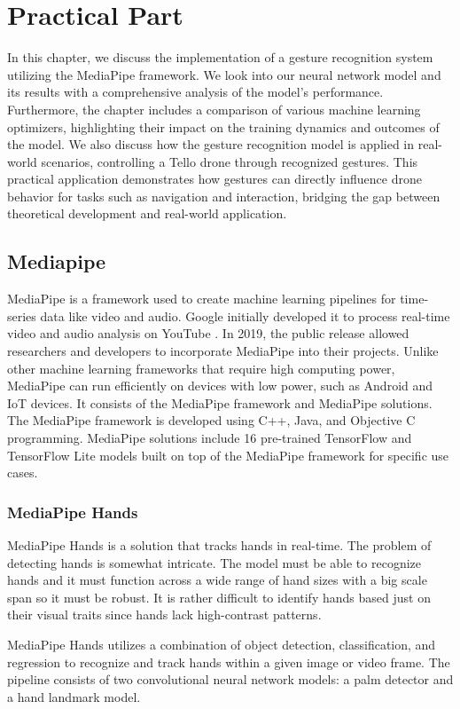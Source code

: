 \chapter{Practical Part}
In this chapter, we discuss the implementation of a gesture recognition system utilizing the MediaPipe framework. We look into our neural network model and its results with a comprehensive analysis of the model's performance. Furthermore, the chapter includes a comparison of various machine learning optimizers, highlighting their impact on the training dynamics and outcomes of the model. We also discuss how the gesture recognition model is applied in real-world scenarios, controlling a Tello drone through recognized gestures. This practical application demonstrates how gestures can directly influence drone behavior for tasks such as navigation and interaction, bridging the gap between theoretical development and real-world application.
\section{Mediapipe}
MediaPipe is a framework used to create machine learning pipelines for time-series data like video and audio. Google initially developed it to process real-time video and audio analysis on YouTube \cite{mediapipe2019blog}. In 2019, the public release allowed researchers and developers to incorporate MediaPipe into their projects. Unlike other machine learning frameworks that require high computing power, MediaPipe can run efficiently on devices with low power, such as Android and IoT devices. It consists of the MediaPipe framework and MediaPipe solutions. The MediaPipe framework is developed using C++, Java, and Objective C programming. MediaPipe solutions include 16 pre-trained TensorFlow and TensorFlow Lite models built on top of the MediaPipe framework for specific use cases.
\subsection{MediaPipe Hands}
MediaPipe Hands is a solution that tracks hands in real-time. The problem of detecting hands is somewhat intricate. The model must be able to recognize hands and it must function across a wide range of hand sizes with a big scale span so it must be robust. It is rather difficult to identify hands based just on their visual traits since hands lack high-contrast patterns.%

MediaPipe Hands utilizes a combination of object detection, classification, and regression to recognize and track hands within a given image or video frame. The pipeline consists of two convolutional neural network models: a palm detector and a hand landmark model.


